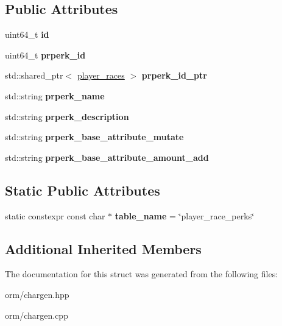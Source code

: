 \subsection*{Public Attributes}
\begin{DoxyCompactItemize}
\item 
\mbox{\label{structmods_1_1orm_1_1player__race__perks_a7578c825ea97d55a00f7f708dad5e438}} 
uint64\+\_\+t {\bfseries id}
\item 
\mbox{\label{structmods_1_1orm_1_1player__race__perks_a80c8512393fa488d54e6e178ddf75a0f}} 
uint64\+\_\+t {\bfseries prperk\+\_\+id}
\item 
\mbox{\label{structmods_1_1orm_1_1player__race__perks_ac72219e1b3c83c36af713ec35f02f1c0}} 
std\+::shared\+\_\+ptr$<$ \hyperlink{structmods_1_1orm_1_1player__races}{player\+\_\+races} $>$ {\bfseries prperk\+\_\+id\+\_\+ptr}
\item 
\mbox{\label{structmods_1_1orm_1_1player__race__perks_af1488d599578b61b06d329024f655390}} 
std\+::string {\bfseries prperk\+\_\+name}
\item 
\mbox{\label{structmods_1_1orm_1_1player__race__perks_ae42972af801fe1a85376806d078c989f}} 
std\+::string {\bfseries prperk\+\_\+description}
\item 
\mbox{\label{structmods_1_1orm_1_1player__race__perks_a541ab73c1ce44921aedfbb1a9cff38f8}} 
std\+::string {\bfseries prperk\+\_\+base\+\_\+attribute\+\_\+mutate}
\item 
\mbox{\label{structmods_1_1orm_1_1player__race__perks_a92e84352eb8dc931cb77002716b6e19c}} 
std\+::string {\bfseries prperk\+\_\+base\+\_\+attribute\+\_\+amount\+\_\+add}
\end{DoxyCompactItemize}
\subsection*{Static Public Attributes}
\begin{DoxyCompactItemize}
\item 
\mbox{\label{structmods_1_1orm_1_1player__race__perks_a2f5b93c596a139ec2069bf320075385f}} 
static constexpr const char $\ast$ {\bfseries table\+\_\+name} = \char`\"{}player\+\_\+race\+\_\+perks\char`\"{}
\end{DoxyCompactItemize}
\subsection*{Additional Inherited Members}


The documentation for this struct was generated from the following files\+:\begin{DoxyCompactItemize}
\item 
orm/chargen.\+hpp\item 
orm/chargen.\+cpp\end{DoxyCompactItemize}
